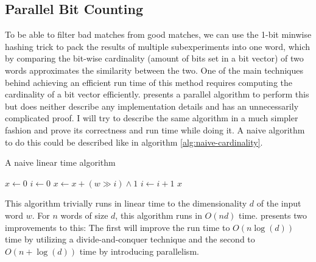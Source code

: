 \subsection{Parallel Bit Counting}
To be able to filter bad matches from good matches, we can use the 1-bit minwise hashing trick to pack the results of multiple subexperiments into one word, which by comparing the bit-wise cardinality (amount of bits set in a bit vector) of two words approximates the similarity between the two. %
One of the main techniques behind achieving an efficient run time of this method requires computing the cardinality of a bit vector efficiently. \citet{fast-similarity-search} presents a parallel algorithm to perform this but does neither describe any implementation details and has an unnecessarily complicated proof. I will try to describe the same algorithm in a much simpler fashion and prove its correctness and run time while doing it.
A naive algorithm to do this could be described like in algorithm \ref{alg:naive-cardinality}.
\begin{algorithm}[H]
\caption{A naive linear time algorithm}\label{alg:naive-cardinality}
\begin{algorithmic}
 
\State $x \gets 0$
\State $i \gets 0$
\State $x \gets x + (w \gg i) \land 1$
\State $i \gets i + 1$
\EndWhile
\State \Return $x$
\EndFunction
\end{algorithmic}
\end{algorithm}
This algorithm trivially runs in linear time to the dimensionality $d$ of the input word $w$. For $n$ words of size $d$, this algorithm runs in $O(nd)$ time.
\citet{fast-similarity-search} presents two improvements to this: The first will improve the run time to $O(n\log(d))$ time by utilizing a divide-and-conquer technique and the second to $O(n + \log(d))$ time by introducing parallelism.

